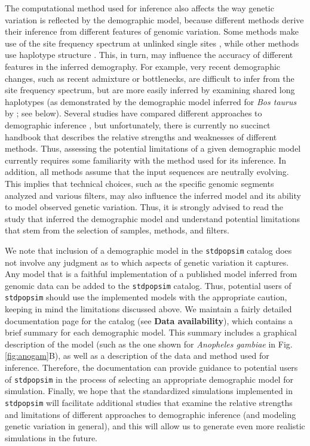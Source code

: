\documentclass[hidelinks]{article}
\newcommand{\stdpopsim}{\texttt{stdpopsim}\xspace}
\begin{document}
The computational method used for inference also affects the way genetic variation
is reflected by the demographic model,
because different methods derive their inference from different features of genomic variation.
Some methods make use of the site frequency spectrum at unlinked single sites
\citep[e.g.,][]{Gutenkunst2009,Excoffier2013,Liu2015}, while other methods use haplotype structure \citep[e.g.,][]{LiDurbin2011,Schiffels2020,browning2015accurate}.
This, in turn, may influence the accuracy of different features in the inferred demography.
For example, very recent demographic changes, such as recent admixture or bottlenecks,
are difficult to infer from the site frequency spectrum,
but are more easily inferred by examining shared long haplotypes
(as demonstrated by the demographic model inferred for \emph{Bos taurus} by \cite{MacLeod2013}; see below).
Several studies have compared different approaches to demographic inference \citep[e.g.,][]{Harris2013,Beichman2017}, but unfortunately, there is currently no succinct handbook that describes the relative strengths and weaknesses of different methods.
Thus, assessing the potential limitations of a given demographic model currently requires 
some familiarity with the method used for its inference.
In addition, all methods assume that the input sequences are neutrally evolving.
This implies that technical choices,
such as the specific genomic segments analyzed and various filters,
may also influence the inferred model and its ability to model observed genetic variation.
Thus, it is strongly advised to read the study that inferred the demographic model
and understand potential limitations that stem from the selection of
samples, methods, and filters. 


We note that inclusion of a demographic model in the \stdpopsim catalog does not involve any judgment as to which aspects of genetic variation it captures.
Any model that is a faithful implementation of a published model inferred from genomic data can be added to the \stdpopsim catalog.
Thus, potential users of \stdpopsim should use the implemented models with the appropriate caution, keeping in mind the limitations discussed above.
We maintain a fairly detailed documentation page for the catalog (see {\bf Data availability}),
which contains a brief summary for each demographic model.
This summary includes a graphical description of the model
(such as the one shown for {\em Anopheles gambiae} in Fig. \ref{fig:anogam}B),
as well as a description of the data and method used for inference.
Therefore, the documentation can provide guidance to potential users of \stdpopsim
in the process of selecting an appropriate demographic model for simulation.
%
Finally, we hope that the standardized simulations implemented in \stdpopsim
will facilitate additional studies that examine the relative strengths and limitations
of different approaches to demographic inference (and modeling genetic variation in general),
and this will allow us to generate even more realistic simulations in the future.
\end{document}

